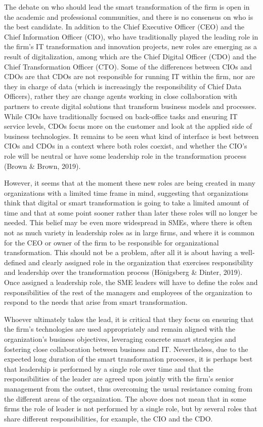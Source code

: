 \documentclass[
  letterpaper,
  DIV=11,
  numbers=noendperiod]{scrreprt}
\begin{document}
The debate on who should lead the smart transformation of the firm is
open in the academic and professional communities, and there is no
consensus on who is the best candidate. In addition to the Chief
Executive Officer (CEO) and the Chief Information Officer (CIO), who
have traditionally played the leading role in the firm's IT
transformation and innovation projects, new roles are emerging as a
result of digitalization, among which are the Chief Digital Officer
(CDO) and the Chief Transformation Officer (CTO). Some of the
differences between CIOs and CDOs are that CDOs are not responsible for
running IT within the firm, nor are they in charge of data (which is
increasingly the responsibility of Chief Data Officers), rather they are
change agents working in close collaboration with partners to create
digital solutions that transform business models and processes. While
CIOs have traditionally focused on back-office tasks and ensuring IT
service levels, CDOs focus more on the customer and look at the applied
side of business technologies. It remains to be seen what kind of
interface is best between CIOs and CDOs in a context where both roles
coexist, and whether the CIO's role will be neutral or have some
leadership role in the transformation process (Brown \& Brown, 2019).

However, it seems that at the moment these new roles are being created
in many organizations with a limited time frame in mind, suggesting that
organizations think that digital or smart transformation is going to
take a limited amount of time and that at some point sooner rather than
later these roles will no longer be needed. This belief may be even more
widespread in SMEs, where there is often not as much variety in
leadership roles as in large firms, and where it is common for the CEO
or owner of the firm to be responsible for organizational
transformation. This should not be a problem, after all it is about
having a well-defined and clearly assigned role in the organization that
exercises responsibility and leadership over the transformation process
(Hönigsberg \& Dinter, 2019). Once assigned a leadership role, the SME
leaders will have to define the roles and responsibilities of the rest
of the managers and employees of the organization to respond to the
needs that arise from smart transformation.

Whoever ultimately takes the lead, it is critical that they focus on
ensuring that the firm's technologies are used appropriately and remain
aligned with the organization's business objectives, leveraging concrete
smart strategies and fostering close collaboration between business and
IT. Nevertheless, due to the expected long duration of the smart
transformation processes, it is perhaps best that leadership is
performed by a single role over time and that the responsibilities of
the leader are agreed upon jointly with the firm's senior management
from the outset, thus overcoming the usual resistance coming from the
different areas of the organization. The above does not mean that in
some firms the role of leader is not performed by a single role, but by
several roles that share different responsibilities, for example, the
CIO and the CDO.
\end{document}
